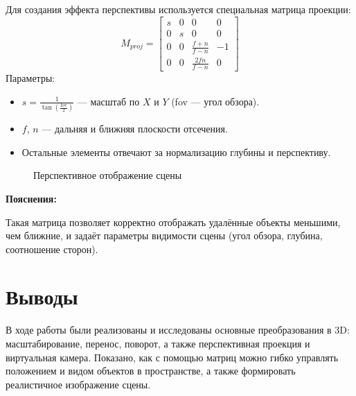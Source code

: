 Для создания эффекта перспективы используется специальная матрица проекции:
\[
M_{proj} = \begin{bmatrix}
s & 0 & 0 & 0 \\
0 & s & 0 & 0 \\
0 & 0 & \frac{f+ n}{f-n} & -1 \\
0 & 0 & \frac{2fn}{f-n} & 0
\end{bmatrix}
\]
Параметры:
\begin{itemize}
    \item $s = \frac{1}{\tan(\frac{\text{fov}}{2})}$ --- масштаб по $X$ и $Y$ (fov --- угол обзора).
    \item $f$, $n$ --- дальняя и ближняя плоскости отсечения.
    \item Остальные элементы отвечают за нормализацию глубины и перспективу.
\end{itemize}

\begin{figure}[h!]
    \centering
    \caption{Перспективное отображение сцены}
\end{figure}

\textbf{Пояснения:}

Такая матрица позволяет корректно отображать удалённые объекты меньшими, чем ближние, и задаёт параметры видимости сцены (угол обзора, глубина, соотношение сторон).

\section{Выводы}

В ходе работы были реализованы и исследованы основные преобразования в 3D: масштабирование, перенос, поворот, а также перспективная проекция и виртуальная камера. Показано, как с помощью матриц можно гибко управлять положением и видом объектов в пространстве, а также формировать реалистичное изображение сцены.
